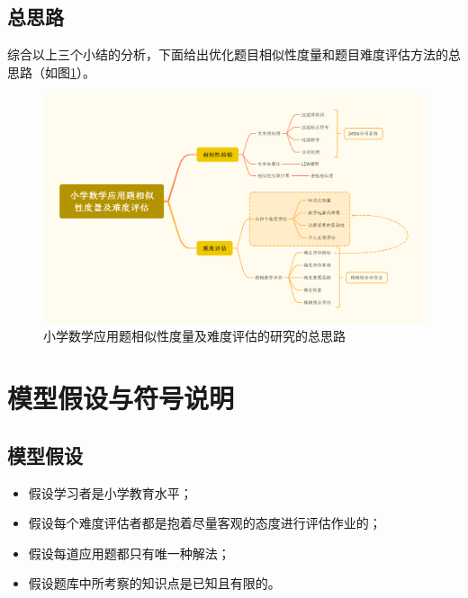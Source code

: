 \subsection{总思路}

综合以上三个小结的分析，下面给出优化题目相似性度量和题目难度评估方法的总思路（如图\ref{figure042108}）。

\begin{figure}[h]
    \centering
    \includegraphics[scale=0.2]{res/figure042108.png}
    \caption{小学数学应用题相似性度量及难度评估的研究的总思路}
    \label{figure042108}
\end{figure}

%
%

\section{模型假设与符号说明}

\subsection{模型假设}

\begin{itemize}
    \item 假设学习者是小学教育水平；
    \item 假设每个难度评估者都是抱着尽量客观的态度进行评估作业的；
    \item 假设每道应用题都只有唯一种解法；
    \item 假设题库中所考察的知识点是已知且有限的。
\end{itemize}

